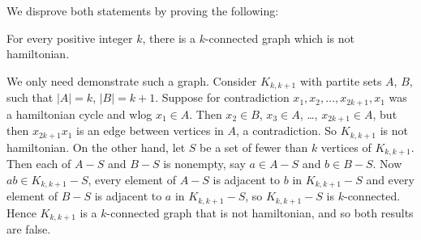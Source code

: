We disprove both statements by proving the following:

For every positive integer $k$, there is a $k$-connected graph which
is not hamiltonian.

We only need demonstrate such a graph. Consider $K_{k,k+1}$ with partite
sets $A$, $B$, such that $|A|=k$, $|B|=k+1$. Suppose for contradiction 
$x_1,x_2,\dots,x_{2k+1},x_1$ was a hamiltonian cycle and wlog $x_1\in A$.
Then $x_2 \in B$, $x_3 \in A$, \dots, $x_{2k+1} \in A$, but then
$x_{2k+1}x_1$ is an edge between vertices in $A$, a contradiction.
So $K_{k,k+1}$ is not hamiltonian. On the other hand, let $S$ be a
set of fewer than $k$ vertices of $K_{k,k+1}$. Then each of $A-S$ and
$B-S$ is nonempty, say $a \in A-S$ and $b \in B-S$.
Now $ab \in K_{k,k+1}-S$, every element of $A-S$ is adjacent to $b$ in
$K_{k,k+1}-S$ and every element of $B-S$ is adjacent to $a$ in
$K_{k,k+1}-S$, so $K_{k,k+1}-S$ is $k$-connected. Hence $K_{k,k+1}$ is
a $k$-connected graph that is not hamiltonian, and so both results
are false.
